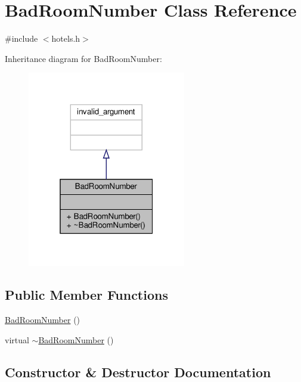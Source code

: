 \hypertarget{class_bad_room_number}{}\section{Bad\+Room\+Number Class Reference}
\label{class_bad_room_number}


{\ttfamily \#include $<$hotels.\+h$>$}



Inheritance diagram for Bad\+Room\+Number\+:\nopagebreak
\begin{figure}[H]
\begin{center}
\leavevmode
\includegraphics[width=196pt]{class_bad_room_number__inherit__graph}
\end{center}
\end{figure}
\subsection*{Public Member Functions}
\begin{DoxyCompactItemize}
\item 
\hyperlink{class_bad_room_number_a5bbd9fb21e5e6b8d29247b7714a478bd}{Bad\+Room\+Number} ()
\item 
virtual \hyperlink{class_bad_room_number_a3691fb5baacd1a49aa96fd6ed7256ef8}{$\sim$\+Bad\+Room\+Number} ()
\end{DoxyCompactItemize}


\subsection{Constructor \& Destructor Documentation}
\mbox{\label{class_bad_room_number_a5bbd9fb21e5e6b8d29247b7714a478bd}} 
